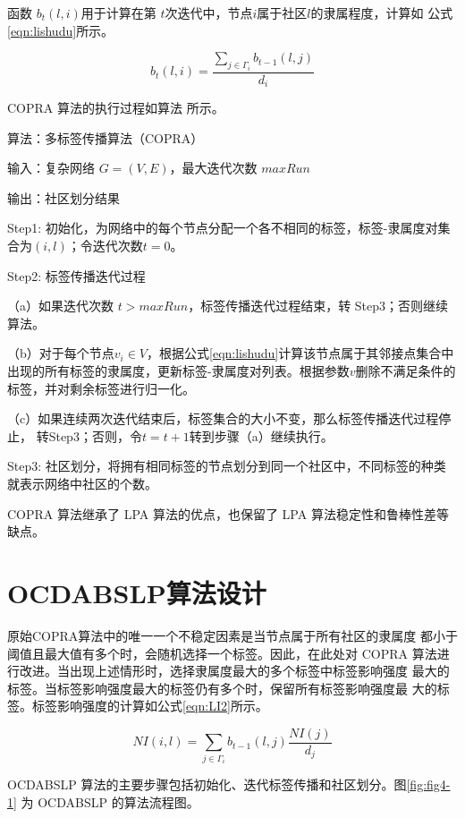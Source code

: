 函数 $b_t(l, i)$用于计算在第 $t $次迭代中，节点$ i $属于社区$ l $的隶属程度，计算如
公式\ref{eqn:lishudu}所示。

\begin{equation}
  \label{eqn:lishudu}
  b_t(l,i)=\frac{\sum_{j\in \Gamma_i }b_{t-1}(l,j)}{d_i}
\end{equation}

COPRA 算法的执行过程如算法 所示。

算法：多标签传播算法（COPRA） 

输入：复杂网络 $G = (V, E)$，最大迭代次数 $maxRun$ 

输出：社区划分结果 

Step1:  初始化，为网络中的每个节点分配一个各不相同的标签，标签-隶属度对集合为${(i,l)}$；令迭代次数$t=0$。

Step2:  标签传播迭代过程 

（a）如果迭代次数 $t > maxRun$，标签传播迭代过程结束，转 Step3；否则继续算法。 

（b）对于每个节点$v_i\in V$，根据公式\ref{eqn:lishudu}计算该节点属于其邻接点集合中出现的所有标签的隶属度，更新标签-隶属度对列表。根据参数$v$删除不满足条件的标签，并对剩余标签进行归一化。 
 
（c）如果连续两次迭代结束后，标签集合的大小不变，那么标签传播迭代过程停止，
转Step3；否则，令$t = t+1$转到步骤（a）继续执行。 

Step3:  社区划分，将拥有相同标签的节点划分到同一个社区中，不同标签的种类就表示网络中社区的个数。

COPRA 算法继承了 LPA 算法的优点，也保留了 LPA 算法稳定性和鲁棒性差等缺点。 

\section{OCDABSLP算法设计}
原始COPRA算法中的唯一一个不稳定因素是当节点属于所有社区的隶属度
都小于阈值且最大值有多个时，会随机选择一个标签。因此，在此处对 COPRA
算法进行改进。当出现上述情形时，选择隶属度最大的多个标签中标签影响强度
最大的标签。当标签影响强度最大的标签仍有多个时，保留所有标签影响强度最
大的标签。标签影响强度的计算如公式\ref{eqn:LI2}所示。

\begin{equation}
  \label{eqn:LI2}
  NI(i,l)=\sum_{j \in \Gamma _i} b_{t-1}(l,j) \frac{NI(j)}{d_j}
\end{equation}

OCDABSLP 算法的主要步骤包括初始化、迭代标签传播和社区划分。图\ref{fig:fig4-1}
为 OCDABSLP 的算法流程图。

